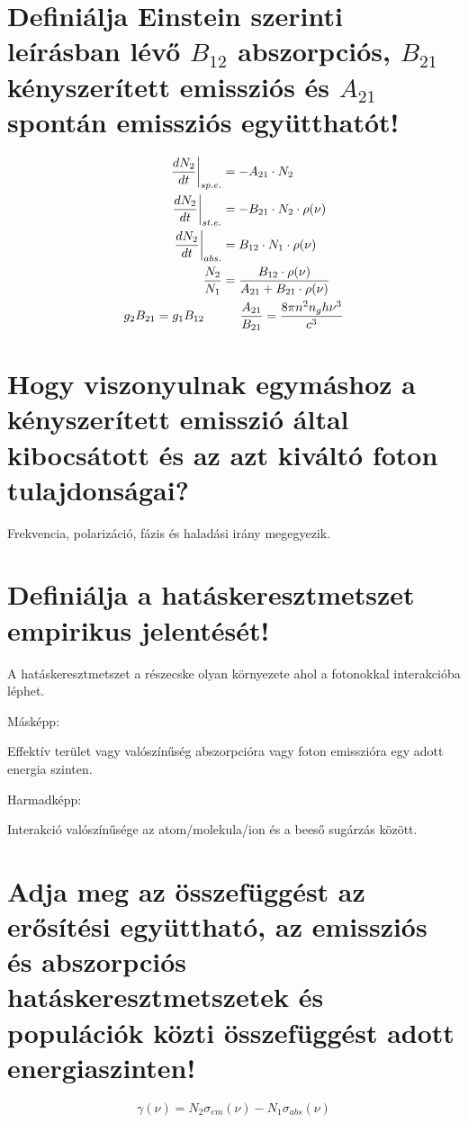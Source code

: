 \documentclass[12pt, a4paper]{article}
\begin{document}
\section{Definiálja Einstein szerinti leírásban lévő $B_{12}$ abszorpciós, $B_{21}$ kényszerített emissziós és $A_{21}$ spontán emissziós együtthatót!}
\begin{align}
\left.\frac{dN_2}{dt}\right\vert_{sp.e.}&=-A_{21}\cdot N_2\\
\left.\frac{dN_2}{dt}\right\vert_{st.e.}&=-B_{21}\cdot N_2\cdot \rho(\nu)\\
\left.\frac{dN_2}{dt}\right\vert_{abs.}&=B_{12}\cdot N_1\cdot \rho(\nu)\\
\frac{N_2}{N_1}&=\frac{B_{12}\cdot\rho(\nu)}{A_{21}+B_{21}\cdot\rho(\nu)}\\
g_2 B_{21} = g_1 B_{12} \hspace{0.5cm} & \hspace{0.5cm} \frac{A_{21}}{B_{21}} = \frac{8 \pi n^2 n_g h \nu^3}{c^3}
\end{align}

\section{Hogy viszonyulnak egymáshoz a kényszerített emisszió által kibocsátott és az azt kiváltó foton tulajdonságai?}
Frekvencia, polarizáció, fázis és haladási irány megegyezik.

\section{Definiálja a hatáskeresztmetszet empirikus jelentését!}
A hatáskeresztmetszet a részecske olyan környezete ahol a fotonokkal interakcióba léphet.

\vspace{0.5cm}Másképp:

Effektív terület vagy valószínűség abszorpcióra vagy foton emisszióra egy adott energia szinten. 

\vspace{0.5cm}Harmadképp:

Interakció valószínűsége az atom/molekula/ion és a beeső sugárzás között.

\section{Adja meg az összefüggést az erősítési együttható, az emissziós és abszorpciós hatáskeresztmetszetek és populációk közti összefüggést adott energiaszinten!}
\begin{equation}
\gamma(\nu)=N_2\sigma_{em}(\nu)-N_1\sigma_{abs}(\nu)
\end{equation}
\end{document}
